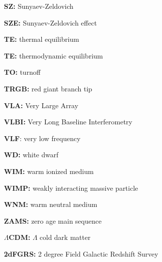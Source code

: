 \documentclass[a4paper,10pt]{article}
\begin{document}
{\noindent}\textbf{SZ:} Sunyaev-Zeldovich

{\noindent}\textbf{SZE:} Sunyaev-Zeldovich effect

{\noindent}\textbf{TE:} thermal equilibrium

{\noindent}\textbf{TE:} thermodynamic equilibrium

{\noindent}\textbf{TO:} turnoff

{\noindent}\textbf{TRGB:} red giant branch tip

{\noindent}\textbf{VLA:} Very Large Array

{\noindent}\textbf{VLBI:} Very Long Baseline Interferometry

{\noindent}\textbf{VLF}: very low frequency

{\noindent}\textbf{WD:} white dwarf

{\noindent}\textbf{WIM:} warm ionized medium

{\noindent}\textbf{WIMP:} weakly interacting massive particle

{\noindent}\textbf{WNM:} warm neutral medium

{\noindent}\textbf{ZAMS:} zero age main sequence

{\noindent}\textbf{$\Lambda$CDM:} $\Lambda$ cold dark matter

{\noindent}\textbf{2dFGRS:} 2 degree Field Galactic Redshift Survey







































\end{document}
